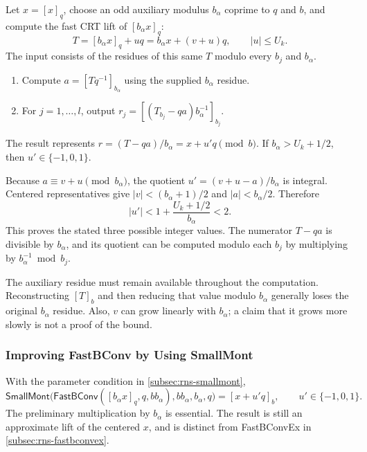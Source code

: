 Let $x=[x]_q$, choose an odd auxiliary modulus $b_\alpha$ coprime to $q$ and $b$, and compute the fast CRT lift of $[b_\alpha x]_q$:
\[
T=[b_\alpha x]_q+uq=b_\alpha x+(v+u)q,
\qquad |u|\leq U_k.
\]
The input consists of the residues of this same $T$ modulo every $b_j$ and $b_\alpha$.
\begin{tcolorbox}[title={\textbf{\tboxlabel{\ref*{subsec:rns-smallmont}} Small Montgomery Reduction: \textsf{SmallMont}}}]
\begin{enumerate}
\item Compute $a=[Tq^{-1}]_{b_\alpha}$ using the supplied $b_\alpha$ residue.
\item For $j=1,\ldots,l$, output $r_j=[(T_{b_j}-qa)b_\alpha^{-1}]_{b_j}$.
\end{enumerate}
The result represents $r=(T-qa)/b_\alpha=x+u'q\pmod b$. If $b_\alpha>U_k+1/2$, then $u'\in\{-1,0,1\}$.
\end{tcolorbox}

\begin{myproof}
Because $a\equiv v+u\pmod{b_\alpha}$, the quotient $u'=(v+u-a)/b_\alpha$ is integral. Centered representatives give $|v|<(b_\alpha+1)/2$ and $|a|<b_\alpha/2$. Therefore
\[
|u'|<1+\frac{U_k+1/2}{b_\alpha}<2.
\]
This proves the stated three possible integer values. The numerator $T-qa$ is divisible by $b_\alpha$, and its quotient can be computed modulo each $b_j$ by multiplying by $b_\alpha^{-1}\bmod b_j$.
\end{myproof}

The auxiliary residue must remain available throughout the computation. Reconstructing $[T]_b$ and then reducing that value modulo $b_\alpha$ generally loses the original $b_\alpha$ residue. Also, $v$ can grow linearly with $b_\alpha$; a claim that it grows more slowly is not a proof of the bound.

\subsubsection{Improving \textsf{FastBConv} by Using \textsf{SmallMont}}
\label{subsubsec:rns-smallmont-fastbconv}

With the parameter condition in \autoref{subsec:rns-smallmont},
\[
\textsf{SmallMont}\bigl(\textsf{FastBConv}([b_\alpha x]_q,q,bb_\alpha),bb_\alpha,b_\alpha,q\bigr)
=[x+u'q]_b,\qquad u'\in\{-1,0,1\}.
\]
The preliminary multiplication by $b_\alpha$ is essential. The result is still an approximate lift of the centered $x$, and is distinct from \textsf{FastBConvEx} in \autoref{subsec:rns-fastbconvex}.


